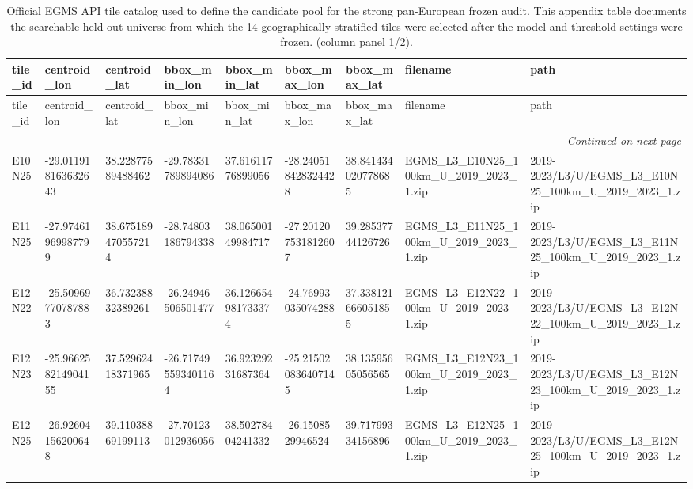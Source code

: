\begin{landscape}
\scriptsize
\setlength{\LTleft}{0pt}
\setlength{\LTright}{0pt}
\begin{longtable}{lllllllll}
\caption{Official EGMS API tile catalog used to define the candidate pool for the strong pan-European frozen audit. This appendix table documents the searchable held-out universe from which the 14 geographically stratified tiles were selected after the model and threshold settings were frozen. (column panel 1/2).}\label{tab:e7_strong_api_catalog}\\
\toprule
tile\_id & centroid\_lon & centroid\_lat & bbox\_min\_lon & bbox\_min\_lat & bbox\_max\_lon & bbox\_max\_lat & filename & path \\
\midrule
\endfirsthead
\toprule
tile\_id & centroid\_lon & centroid\_lat & bbox\_min\_lon & bbox\_min\_lat & bbox\_max\_lon & bbox\_max\_lat & filename & path \\
\midrule
\endhead
\midrule
\multicolumn{9}{r}{\textit{Continued on next page}} \\
\endfoot
\bottomrule
\endlastfoot
E10N25 & -29.011918163632643 & 38.22877589488462 & -29.78331789894086 & 37.61611776899056 & -28.240518428324428 & 38.841434020778685 & EGMS\_L3\_E10N25\_100km\_U\_2019\_2023\_1.zip & 2019-2023/L3/U/EGMS\_L3\_E10N25\_100km\_U\_2019\_2023\_1.zip \\
E11N25 & -27.97461969987799 & 38.675189470557214 & -28.74803186794338 & 38.06500149984717 & -27.201207531812607 & 39.28537744126726 & EGMS\_L3\_E11N25\_100km\_U\_2019\_2023\_1.zip & 2019-2023/L3/U/EGMS\_L3\_E11N25\_100km\_U\_2019\_2023\_1.zip \\
E12N22 & -25.50969770787883 & 36.73238832389261 & -26.24946506501477 & 36.126654981733374 & -24.76993035074288 & 37.338121666051855 & EGMS\_L3\_E12N22\_100km\_U\_2019\_2023\_1.zip & 2019-2023/L3/U/EGMS\_L3\_E12N22\_100km\_U\_2019\_2023\_1.zip \\
E12N23 & -25.966258214904155 & 37.52962418371965 & -26.717495593401164 & 36.92329231687364 & -25.215020836407145 & 38.13595605056565 & EGMS\_L3\_E12N23\_100km\_U\_2019\_2023\_1.zip & 2019-2023/L3/U/EGMS\_L3\_E12N23\_100km\_U\_2019\_2023\_1.zip \\
E12N25 & -26.92604156200648 & 39.11038869199113 & -27.70123012936056 & 38.50278404241332 & -26.1508529946524 & 39.71799334156896 & EGMS\_L3\_E12N25\_100km\_U\_2019\_2023\_1.zip & 2019-2023/L3/U/EGMS\_L3\_E12N25\_100km\_U\_2019\_2023\_1.zip \\

\end{longtable}
\end{landscape}
